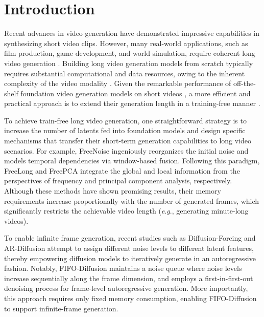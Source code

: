 \documentclass{article}
\theoremstyle{plain}
\theoremstyle{definition}
\theoremstyle{remark}
\newcommand{\eg}{\textit{e}.\textit{g}.}
\begin{document}
\section{Introduction}

Recent advances in video generation \cite{wan2025wan,yang2024cogvideox} have demonstrated impressive capabilities in synthesizing short video clips. However, many real-world applications, such as film production, game development, and world simulation, require coherent long video generation \cite{cho2024sora,mao2026omni}. 
Building long video generation models from scratch typically requires substantial computational and data resources, owing to the inherent complexity of the video modality \cite{waseem2024video,hu2023multi}.
Given the remarkable performance of off-the-shelf foundation video generation models on short videos \cite{chen2024videocrafter2,wan2025wan}, a more efficient and practical approach is to extend their generation length in a training-free manner \cite{qiu2023freenoise}.


To achieve train-free long video generation, one straightforward strategy is to increase the number of latents fed into foundation models and design specific mechanisms that transfer their short-term generation capabilities to long video scenarios.
For example, FreeNoise \cite{qiu2023freenoise} ingeniously reorganizes the initial noise and models temporal dependencies via window-based fusion.
Following this paradigm, FreeLong \cite{lu2024freelong} and FreePCA \cite{tan2025freepca} integrate the global and local information from the perspectives of frequency and principal component analysis, respectively.
Although these methods have shown promising results, their memory requirements increase proportionally with the number of generated frames, which significantly restricts the achievable video length (\eg, generating minute-long videos).



To enable infinite frame generation, recent studies such as Diffusion-Forcing \cite{chen2024diffusion} and AR-Diffusion \cite{sun2025ar} attempt to assign different noise levels to different latent features, thereby empowering diffusion models to iteratively generate in an autoregressive fashion. 
Notably, FIFO-Diffusion \cite{kim2024fifo} maintains a noise queue where noise levels increase sequentially along the frame dimension, and employs a first-in-first-out denoising process for frame-level autoregressive generation. More importantly, this approach requires only fixed memory consumption, enabling FIFO-Diffusion to support infinite-frame generation.
\end{document}
